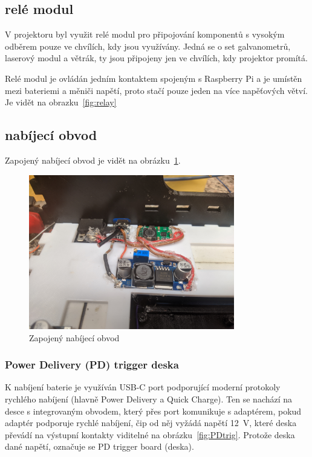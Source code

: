 \subsection{relé modul}
V projektoru byl využit relé modul pro připojování komponentů s vysokým odběrem pouze ve chvílích, kdy jsou využívány. Jedná se o set galvanometrů, laserový modul a větrák, ty jsou připojeny jen ve chvílích, kdy projektor promítá.

Relé modul je ovládán jedním kontaktem spojeným s Raspberry Pi a je umístěn mezi bateriemi a měniči napětí, proto stačí pouze jeden na více napěťových větví. Je vidět na obrazku~\ref{fig:relay}

\subsection{nabíjecí obvod}
Zapojený nabíjecí obvod je vidět na obrázku~\ref{fig:hw_charging_circuit}.

\begin{figure}[htb]
  \centering
  \includegraphics[width=0.8\textwidth]{img/hw_charging_circuit.jpg}
  \caption{\label{fig:hw_charging_circuit} Zapojený nabíjecí obvod}
\end{figure}

\subsubsection{Power Delivery (PD) trigger deska}
K nabíjení baterie je využíván USB-C port podporující moderní protokoly rychlého nabíjení (hlavně Power Delivery a Quick Charge). Ten se nachází na desce s integrovaným obvodem, který přes port komunikuje s adaptérem, pokud adaptér podporuje rychlé nabíjení, čip od něj vyžádá napětí 12~V, které deska převádí na výstupní kontakty viditelné na obrázku~\ref{fig:PDtrig}. Protože deska  dané napětí, označuje se PD trigger board (deska).


